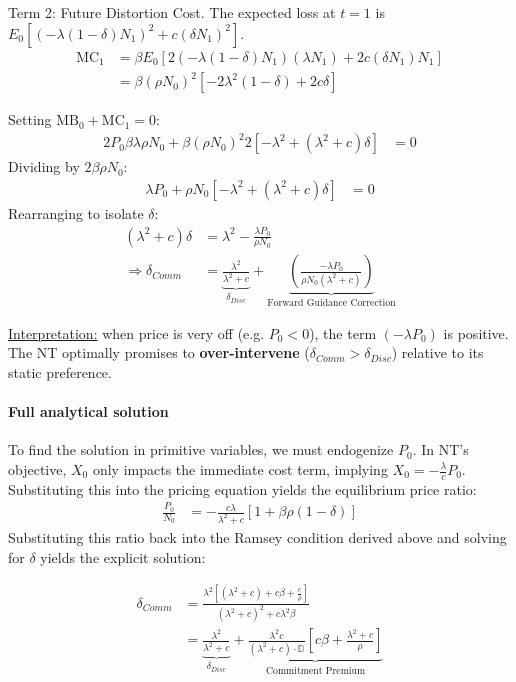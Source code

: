 \documentclass[12pt]{article}
\begin{document}
\noindent Term 2: Future Distortion Cost. The expected loss at $t=1$ is $E_0 [ (-\lambda(1-\delta)N_1)^2 + c(\delta N_1)^2 ]$.
\begin{align}
    \text{MC}_1 &= \beta E_0 [ 2(-\lambda(1-\delta)N_1)(\lambda N_1) + 2c(\delta N_1) N_1 ] \nonumber \\
    &= \beta (\rho N_0)^2 [ -2\lambda^2(1-\delta) + 2c\delta ]
\end{align}

Setting $\text{MB}_0 + \text{MC}_1 = 0$:
\begin{align}
    2 P_0 \beta \lambda \rho N_0 + \beta (\rho N_0)^2 2 [ -\lambda^2 + (\lambda^2 + c)\delta ] &= 0
\end{align}
Dividing by $2 \beta \rho N_0$:
\begin{align}
    \lambda P_0 + \rho N_0 [ -\lambda^2 + (\lambda^2 + c)\delta ] &= 0
\end{align}
Rearranging to isolate $\delta$:
\begin{align}
    (\lambda^2 + c) \delta &= \lambda^2 - \frac{\lambda P_0}{\rho N_0} \\
    \Rightarrow 
    \delta_{Comm} &= \underbrace{\frac{\lambda^2}{\lambda^2 + c}}_{\delta_{Disc}} + \underbrace{\left( \frac{-\lambda P_0}{\rho N_0 (\lambda^2 + c)} \right)}_{\text{Forward Guidance Correction}}
\end{align}

\noindent \underline{Interpretation:} when price is very off (e.g. $P_0 < 0$), the term $(-\lambda P_0)$ is positive. The NT optimally promises to \textbf{over-intervene} ($\delta_{Comm} > \delta_{Disc}$) relative to its static preference. 

\paragraph{Full analytical solution}
To find the solution in primitive variables, we must endogenize $P_0$. In NT's objective, $X_0$ only impacts the immediate cost term, implying $X_0 = -\frac{\lambda}{c} P_0$. Substituting this into the pricing equation yields the equilibrium price ratio:
\begin{align}
    \frac{P_0}{N_0} &= - \frac{c \lambda}{\lambda^2 + c} \left[ 1 + \beta \rho (1-\delta) \right]
\end{align}
Substituting this ratio back into the Ramsey condition derived above and solving for $\delta$ yields the explicit solution:

\begin{align}
    \delta_{Comm} & = \frac{\lambda^2 \left[ (\lambda^2 + c) + c\beta + \frac{c}{\rho} \right]}{(\lambda^2 + c)^2 + c \lambda^2 \beta} \\
    &= \underbrace{\frac{\lambda^2}{\lambda^2 + c}}_{\delta_{Disc}} + \underbrace{\frac{\lambda^2 c}{(\lambda^2 + c) \cdot \mathbb{D}} \left[ c\beta + \frac{\lambda^2 + c}{\rho} \right]}_{\text{Commitment Premium}}
\end{align}
\end{document}
